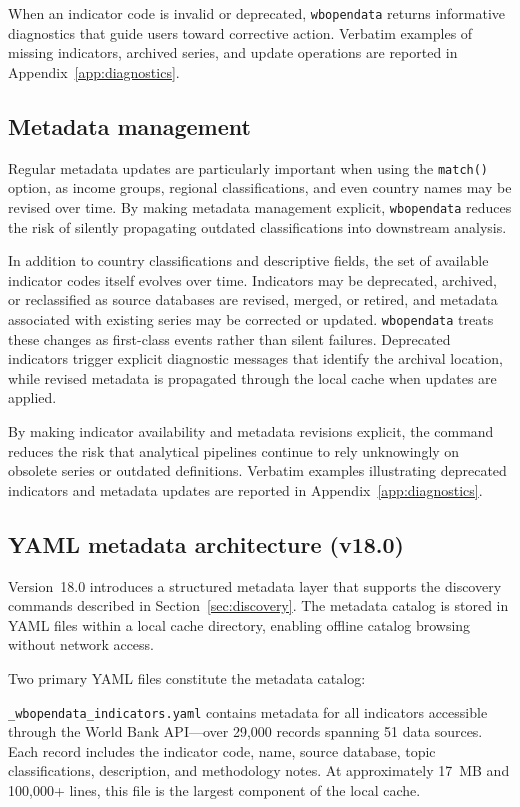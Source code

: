 \documentclass[bib]{statapress}
\begin{document}
When an indicator code is invalid or deprecated, \texttt{wbopendata} returns
informative diagnostics that guide users toward corrective action. Verbatim
examples of missing indicators, archived series, and update operations are
reported in Appendix~\ref{app:diagnostics}.

\subsection{Metadata management}\label{sec:metadata}

Regular metadata updates are particularly important when using the
\texttt{match()} option, as income groups, regional classifications, and even
country names may be revised over time. By making metadata management explicit,
\texttt{wbopendata} reduces the risk of silently propagating outdated
classifications into downstream analysis.

In addition to country classifications and descriptive fields, the set of
available indicator codes itself evolves over time. Indicators may be
deprecated, archived, or reclassified as source databases are revised, merged,
or retired, and metadata associated with existing series may be corrected or
updated. \texttt{wbopendata} treats these changes as first-class events rather
than silent failures. Deprecated indicators trigger explicit diagnostic
messages that identify the archival location, while revised metadata is
propagated through the local cache when updates are applied.

By making indicator availability and metadata revisions explicit, the command
reduces the risk that analytical pipelines continue to rely unknowingly on
obsolete series or outdated definitions. Verbatim examples illustrating
deprecated indicators and metadata updates are reported in Appendix~\ref{app:diagnostics}.

\subsection{YAML metadata architecture (v18.0)}\label{sec:yaml}

Version~18.0 introduces a structured metadata layer that supports the discovery
commands described in Section~\ref{sec:discovery}. The metadata catalog is stored
in YAML files within a local cache directory, enabling offline catalog browsing
without network access.

Two primary YAML files constitute the metadata catalog:

\hangpara
\texttt{\_wbopendata\_indicators.yaml} contains metadata for all indicators
accessible through the World Bank API---over 29{,}000 records spanning 51 data
sources. Each record includes the indicator code, name, source database,
topic classifications, description, and methodology notes. At approximately
17~MB and 100{,}000+ lines, this file is the largest component of the local
cache.
\end{document}
